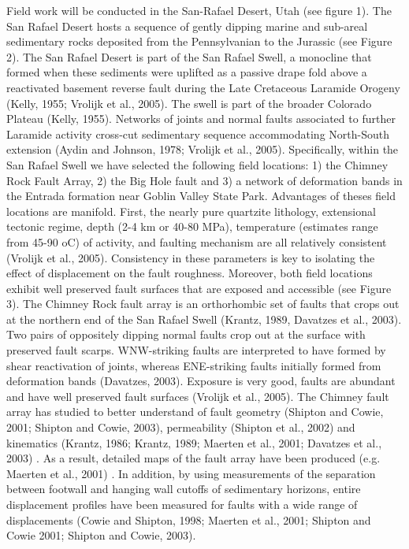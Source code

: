 \documentclass[12pt,a4paper]{article}
\begin{document}
Field work will be conducted in the San-Rafael Desert, Utah (see figure 1). The San Rafael Desert hosts a sequence of gently dipping marine and sub-areal sedimentary rocks deposited from the Pennsylvanian to the Jurassic (see Figure 2). 
The San Rafael Desert is part of the San Rafael Swell, a monocline that formed when these sediments were uplifted as a passive drape fold above a reactivated basement reverse fault during the Late Cretaceous Laramide Orogeny (Kelly, 1955; Vrolijk et al., 2005). The swell is part of the broader Colorado Plateau (Kelly, 1955). Networks of joints and normal faults associated to further Laramide activity cross-cut sedimentary sequence accommodating North-South extension (Aydin and Johnson, 1978; Vrolijk et al., 2005). Specifically, within the San Rafael Swell we have selected the following field locations: 1) the Chimney Rock Fault Array, 2) the Big Hole fault and 3) a network of deformation bands in the Entrada formation near Goblin Valley State Park.  Advantages of theses field locations are manifold. First, the nearly pure quartzite lithology, extensional tectonic regime, depth (2-4 km or 40-80 MPa), temperature (estimates range from 45-90 oC) of activity, and faulting mechanism are all relatively consistent (Vrolijk et al., 2005). Consistency in these parameters is key to isolating the effect of displacement on the fault roughness. Moreover, both field locations exhibit well preserved fault surfaces that are exposed and accessible (see Figure 3). 
The Chimney Rock fault array is an orthorhombic set of faults that crops out at the northern end of the San Rafael Swell (Krantz, 1989, Davatzes et al., 2003). Two pairs of oppositely dipping normal faults crop out at the surface with preserved fault scarps. WNW-striking faults are interpreted to have formed by shear reactivation of joints, whereas ENE-striking faults initially formed from deformation bands (Davatzes, 2003). Exposure is very good, faults are abundant and have well preserved fault surfaces (Vrolijk et al., 2005). The Chimney fault array has studied to better understand of fault geometry (Shipton and Cowie, 2001; Shipton and Cowie, 2003), permeability (Shipton et al., 2002) and kinematics (Krantz, 1986; Krantz, 1989; Maerten et al., 2001; Davatzes et al., 2003) . As a result, detailed maps of the fault array have been produced (e.g. Maerten et al., 2001) . In addition, by using measurements of the separation between footwall and hanging wall cutoffs of sedimentary horizons, entire displacement profiles have been measured for faults with a wide range of displacements (Cowie and Shipton, 1998; Maerten et al., 2001; Shipton and Cowie 2001; Shipton and Cowie, 2003). 
\end{document}
